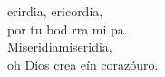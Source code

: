 \begin{cancion}[Misericordia][Ixcís]%
	erirdia, ericordia,\\
	por tu bod rra mi pa.\\
	Miseridiamiseridia,\\
	oh Dios crea eín corazóuro.  \\
\end{cancion}%
